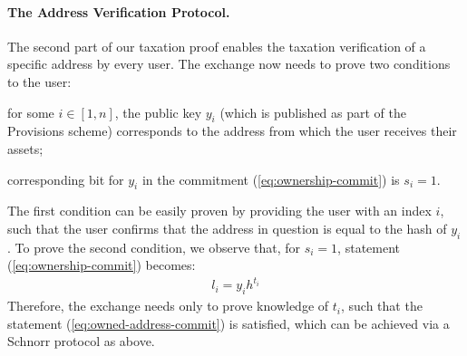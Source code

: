 \paragraph{The Address Verification Protocol.}\label{subsec:user-verification-proto}

The second part of our taxation proof enables the taxation verification of a
specific address by every user. The exchange now needs to prove two conditions
to the user:
\begin{inparaenum}[i)]
    \item for some $i \in [1, n]$, the public key $y_i$ (which is published as
        part of the Provisions scheme) corresponds to the address from which
        the user receives their assets;
    \item corresponding bit for $y_i$ in the commitment
        (\ref{eq:ownership-commit}) is $s_i = 1$.
\end{inparaenum}
The first condition can be easily proven by providing the user with an index
$i$, such that the user confirms that the address in question is equal to the
hash of $y_i$. To prove the second condition, we observe that, for $s_i = 1$,
statement (\ref{eq:ownership-commit}) becomes:
\begin{align}
    l_i = y_ih^{t_i} \label{eq:owned-address-commit}
\end{align}
Therefore, the exchange needs only to prove knowledge of $t_i$, such that the
statement (\ref{eq:owned-address-commit}) is satisfied, which can be achieved
via a Schnorr protocol as above.

